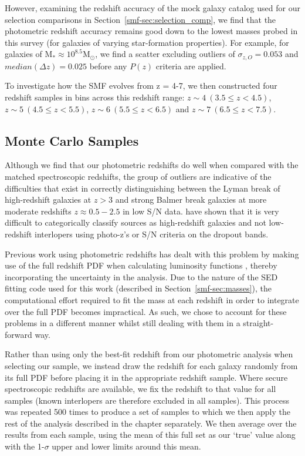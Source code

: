 However, examining the redshift accuracy of the mock galaxy catalog used for our selection comparisons in Section~\ref{smf-sec:selection_comp}, we find that the photometric redshift accuracy remains good down to the lowest masses probed in this survey (for galaxies of varying star-formation properties). For example, for galaxies of $\text{M}_{*} \approx 10^{8.5} \text{M}_{\odot}$, we find a scatter excluding outliers of $\sigma_{z,O} = 0.053$ and $median(\Delta z) = 0.025$ before any $P(z)$ criteria are applied.

To investigate how the SMF evolves from z = 4-7, we then constructed four redshift samples in bins across this redshift range: $z \sim 4 ~(3.5 \leq z < 4.5)$, $z \sim 5~ (4.5 \leq z < 5.5)$, $z \sim 6~(5.5 \leq z < 6.5)$ and $z \sim 7 ~(6.5 \leq z < 7.5)$.

\subsection{Monte Carlo Samples}\label{smf-sec:MC}
Although we find that our photometric redshifts do well when compared with the matched spectroscopic redshifts, the group of outliers are indicative of the difficulties that exist in correctly distinguishing between the Lyman break of high-redshift galaxies at $z > 3$ and strong Balmer break galaxies at more moderate redshifts $z \approx 0.5-2.5$ in low S/N data. \citet{2012ApJ...748..122P,Pirzkal:2013ug} have shown that it is very difficult to categorically classify sources as high-redshift galaxies and not low-redshift interlopers using photo-z's or S/N criteria on the dropout bands.

Previous work using photometric redshifts has dealt with this problem by making use of the full redshift PDF when calculating luminosity functions \citep{2005ApJ...631..126D,2009MNRAS.395.2196M,McLure:2013hh}, thereby incorporating the uncertainty in the analysis. Due to the nature of the SED fitting code used for this work (described in Section~\ref{smf-sec:masses}), the computational effort required to fit the mass at each redshift in order to integrate over the full PDF becomes impractical. As such, we chose to account for these problems in a different manner whilst still dealing with them in a straight-forward way. 

Rather than using only the best-fit redshift from our photometric analysis when selecting our sample, we instead draw the redshift for each galaxy randomly from its full PDF before placing it in the appropriate redshift sample. Where secure spectroscopic redshifts are available, we fix the redshift to that value for all samples (known interlopers are therefore excluded in all samples). This process was repeated 500 times to produce a set of samples to which we then apply the rest of the analysis described in the chapter separately. We then average over the results from each sample, using the mean of this full set as our `true' value along with the 1-$\sigma$ upper and lower limits around this mean. 

